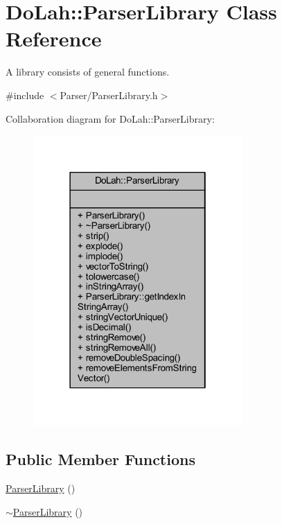 \hypertarget{class_do_lah_1_1_parser_library}{}\section{Do\+Lah\+:\+:Parser\+Library Class Reference}
\label{class_do_lah_1_1_parser_library}


A library consists of general functions.  




{\ttfamily \#include $<$Parser/\+Parser\+Library.\+h$>$}



Collaboration diagram for Do\+Lah\+:\+:Parser\+Library\+:\nopagebreak
\begin{figure}[H]
\begin{center}
\leavevmode
\includegraphics[width=226pt]{class_do_lah_1_1_parser_library__coll__graph}
\end{center}
\end{figure}
\subsection*{Public Member Functions}
\begin{DoxyCompactItemize}
\item 
\hyperlink{class_do_lah_1_1_parser_library_a277f35811bf49ef87ac36e8ddb6c340e}{Parser\+Library} ()
\item 
\hyperlink{class_do_lah_1_1_parser_library_a98f3ffadc8dab51a360b1d733494be06}{$\sim$\+Parser\+Library} ()
\end{DoxyCompactItemize}
